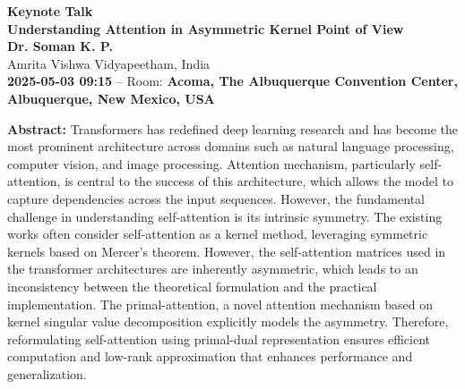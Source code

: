 \documentclass[11pt,oneside]{book}
\begin{document}
  \begin{center}
          {\Large \textbf{Keynote Talk}\\}
      {\LARGE \textbf{Understanding Attention in Asymmetric Kernel Point of View}\\}
        \vspace*{0.5cm}
    \textbf{Dr. Soman K. P.}\\
        Amrita Vishwa Vidyapeetham, India\\
        
        
        \textbf{2025-05-03 09:15} -- 
                Room: \textbf{Acoma, The Albuquerque Convention Center, Albuquerque, New Mexico, USA}\\
        
  \end{center}

  \vspace*{0.2cm}
    \textbf{Abstract:} Transformers has redefined deep learning research and has become the most prominent architecture across domains such as natural language processing, computer vision, and image processing. Attention mechanism, particularly self-attention, is central to the success of this architecture, which allows the model to capture dependencies across the input sequences. However, the fundamental challenge in understanding self-attention is its intrinsic symmetry. The existing works often consider self-attention as a kernel method, leveraging symmetric kernels based on Mercer's theorem. However, the self-attention matrices used in the transformer architectures are inherently asymmetric, which leads to an inconsistency between the theoretical formulation and the practical implementation. The primal-attention, a novel attention mechanism based on kernel singular value decomposition explicitly models the asymmetry. Therefore, reformulating self-attention using primal-dual representation ensures efficient computation and low-rank approximation that enhances performance and generalization. 
\\
  \newline
  
\end{document}
